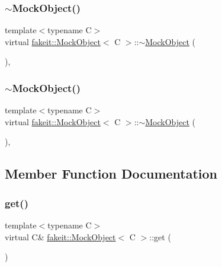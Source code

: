 \subsubsection{\texorpdfstring{$\sim$MockObject()}{~MockObject()}\hspace{0.1cm}{\footnotesize\ttfamily [8/9]}}
{\footnotesize\ttfamily template$<$typename C$>$ \\
virtual \mbox{\hyperlink{structfakeit_1_1MockObject}{fakeit\+::\+Mock\+Object}}$<$ C $>$\+::$\sim$\mbox{\hyperlink{structfakeit_1_1MockObject}{Mock\+Object}} (\begin{DoxyParamCaption}{ }\end{DoxyParamCaption})\hspace{0.3cm}{\ttfamily [inline]}, {\ttfamily [virtual]}}

\mbox{\label{structfakeit_1_1MockObject_aba533bcf929bb012934089f767e9863c}} 
\subsubsection{\texorpdfstring{$\sim$MockObject()}{~MockObject()}\hspace{0.1cm}{\footnotesize\ttfamily [9/9]}}
{\footnotesize\ttfamily template$<$typename C$>$ \\
virtual \mbox{\hyperlink{structfakeit_1_1MockObject}{fakeit\+::\+Mock\+Object}}$<$ C $>$\+::$\sim$\mbox{\hyperlink{structfakeit_1_1MockObject}{Mock\+Object}} (\begin{DoxyParamCaption}{ }\end{DoxyParamCaption})\hspace{0.3cm}{\ttfamily [inline]}, {\ttfamily [virtual]}}



\subsection{Member Function Documentation}
\mbox{\label{structfakeit_1_1MockObject_a0212799b76097b93a51993cb3af0894a}} 
\subsubsection{\texorpdfstring{get()}{get()}\hspace{0.1cm}{\footnotesize\ttfamily [1/9]}}
{\footnotesize\ttfamily template$<$typename C$>$ \\
virtual C\& \mbox{\hyperlink{structfakeit_1_1MockObject}{fakeit\+::\+Mock\+Object}}$<$ C $>$\+::get (\begin{DoxyParamCaption}{ }\end{DoxyParamCaption})\hspace{0.3cm}{\ttfamily [pure virtual]}}



